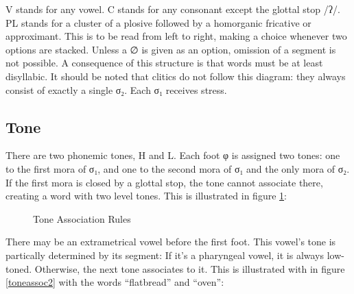 \documentclass{article}
\newcommand{\en}[1]{``#1''}
\newcommand{\con}[1]{\hspace{0pt}{\color{olive}#1}}
\begin{document}
V stands for any vowel. C stands for any consonant except the glottal stop /ʔ/. PL stands for a cluster of a plosive followed by a homorganic fricative or approximant. 
This is to be read from left to right, making a choice whenever two options are stacked. Unless a ∅ is given as an option, omission of a segment is not possible. A consequence of this structure is that words must be at least disyllabic. It should be noted that clitics do not follow this diagram: they always consist of exactly a single σ₂. Each σ₁ receives stress. 


\subsection{Tone}
There are two phonemic tones, H and L. Each foot φ is assigned two tones: one to the first mora of σ₁, and one to the second mora of σ₁ and the only mora of σ₂. If the first mora is closed by a glottal stop, the tone cannot associate there, creating a word with two level tones. This is illustrated in figure \ref{toneassoc}:

\begin{figure}[H]
\centering
{}
\hspace{10pt}
\caption{Tone Association Rules}
\label{toneassoc}
\end{figure}

There may be an extrametrical vowel before the first foot. This vowel’s tone is partically determined by its segment: If it’s a pharyngeal vowel, it is always low-toned. Otherwise, the next tone associates to it. This is illustrated with in figure \ref{toneassoc2} with the words \con{itseoxą́} \en{flatbread} and \con{ǫllúhnne} \en{oven}:
\end{document}
